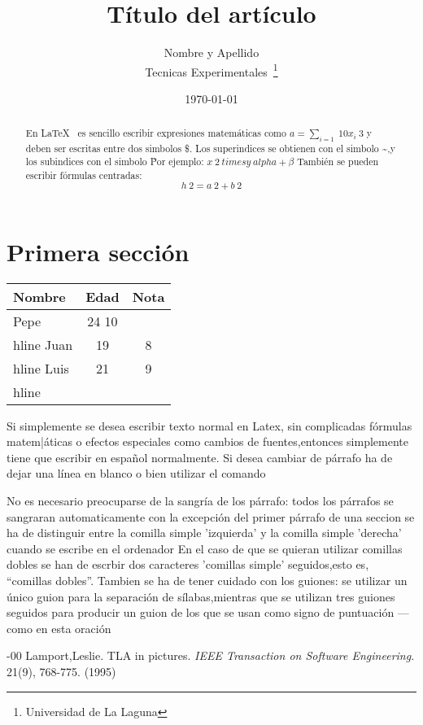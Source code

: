 \documentclass[a4paper,12pt]{article}
\begin{document}
\title{Título del artículo}
\author{Nombre y Apellido \\
        Tecnicas Experimentales~\footnote{Universidad de La Laguna}
        }
\date{\today}
\maketitle
\begin{abstract}
  En \LaTeX{}~\cite{Lam:86} es sencillo escribir expresiones
  matemáticas como $a=\sum_{i=1}~{10} {x_i}~{3}$
  y deben ser escritas entre dos simbolos \$.
  Los superindices se obtienen con el simbolo \~{},y
  los subindices con el simbolo \.
  Por ejemplo: $x~2 \ times y~{alpha + \beta}$
  También se pueden escribir fórmulas centradas:
  \[h~2=a~2 + b~2 \]
  \end{abstract}
  
  \section{Primera sección}
  \bigakip
  \begin{tabular}{|l|c|c|}
  \hline
       Nombre & Edad & Nota \\ \hline
       Pepe   &   24     10 \\ hline
       Juan   & 19&  8 \\ hline
       Luis  & 21&  9\\hline
       \end{tabular}
 Si simplemente se desea escribir texto normal en Latex,
 sin complicadas f\'ormulas matem|\'aticas o efectos especiales
 como cambios de fuentes,entonces simplemente tiene que escribir
 en espa\~nol normalmente.
 Si desea cambiar de párrafo ha de dejar una línea en blanco o bien 
 utilizar el comando \par
 No es necesario preocuparse de la sangría de los párrafo:
 todos  los párrafos se sangraran automaticamente con la excepción
 del primer párrafo de una seccion
 se ha de distinguir entre la comilla simple 'izquierda'
 y la comilla simple 'derecha' cuando se escribe en el ordenador
 En el caso de que se quieran utilizar comillas dobles se han de 
 escrbir dos caracteres 'comillas simple' seguidos,esto es,
 ``comillas dobles''.
 Tambien se ha de tener cuidado con los guiones: se utilizar un único 
 guion para la separación de sílabas,mientras que se utilizan
 tres guiones seguidos para producir un guion de los que se usan
 como signo de puntuación ---como en esta oración
 \begin{thebibliography}-{00}
   Lamport,Leslie.
   TLA in pictures.
   \emph{IEEE Transaction on Software Engineering}.
   21(9), 768-775.
   (1995)
   \end{thebibliography}
\end{document}
